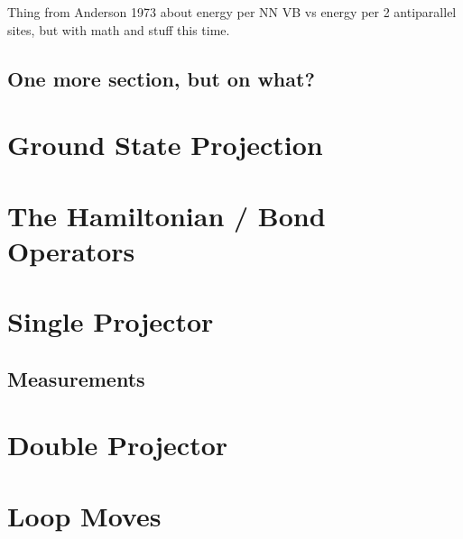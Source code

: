 {\color{red} Thing from Anderson 1973 about energy per NN VB vs energy per 2 antiparallel sites,
but with math and stuff this time.}

\subsection{One more section, but on what?}


\section{Ground State Projection}
\section{The Hamiltonian / Bond Operators}
\section{Single Projector}
\subsection{Measurements}
\section{Double Projector}
\section{Loop Moves}
